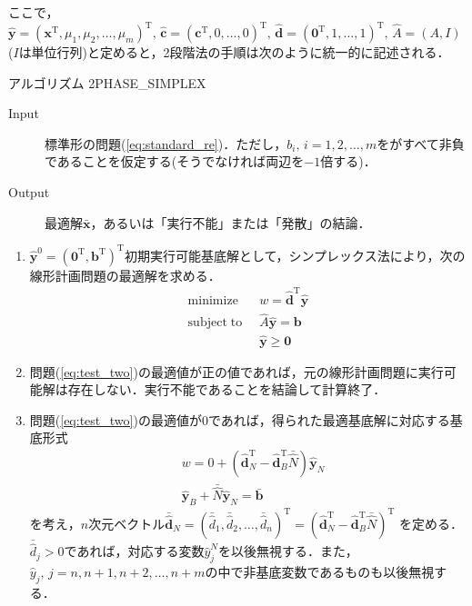\documentclass{jsreport}
\begin{document}
ここで，$\hat{\bm{y}} = (\bm{x}^{\mathrm{T}}, \mu_1, \mu_2, \ldots, \mu_m)^{\mathrm{T}}, \,
\hat{\bm{c}} = (\bm{c}^{\mathrm{T}}, 0, \ldots, 0)^{\mathrm{T}}, \,
\hat{\bm{d}} = (\bm{0}^{\mathrm{T}}, 1, \ldots, 1)^{\mathrm{T}}, \,
\hat{A} = (A, I)$($I$は単位行列)と定めると，2段階法の手順は次のように統一的に記述される．

\begin{itembox}[l]{アルゴリズム 2PHASE\_SIMPLEX}
  \begin{description}
    \item[Input] 標準形の問題(\ref{eq:standard_re})．ただし，$b_i, \, i = 1, 2, \ldots, m$をがすべて非負であることを仮定する(そうでなければ両辺を$-1$倍する)．
    \item[Output] 最適解$\bar{\bm{x}}$，あるいは「実行不能」または「発散」の結論．
  \end{description}
  \begin{enumerate}
    \item $\hat{\bm{y}}^0 = (\bm{0}^{\mathrm{T}},\bm{b}^{\mathrm{T}})^{\mathrm{T}}$初期実行可能基底解として，シンプレックス法により，次の線形計画問題の最適解を求める．
    \begin{align}\label{eq:test_two}
      \mathrm{minimize} \; \; &w = \hat{\bm{d}}^{\mathrm{T}} \hat{\bm{y}} \nonumber \\
      \mathrm{subject \; to} \; \; &\hat{A}\hat{\bm{y}} = \bm{b} \\
      &\hat{\bm{y}} \geq \bm{0} \nonumber
    \end{align}
    \item 問題(\ref{eq:test_two})の最適値が正の値であれば，元の線形計画問題に実行可能解は存在しない．実行不能であることを結論して計算終了．
    \item 問題(\ref{eq:test_two})の最適値が$0$であれば，得られた最適基底解に対応する基底形式
    \begin{align}\label{eq:two_basic}
      &w = 0 + (\hat{\bm{d}}_N^{\mathrm{T}} - \hat{\bm{d}}_B^{\mathrm{T}}\bar{\hat{N}}) \hat{\bm{y}}_N \nonumber \\
      &\hat{\bm{y}}_B + \bar{\hat{N}}\hat{\bm{y}}_N = \bar{\bm{b}}
    \end{align}
    を考え，$n$次元ベクトル$\bar{\hat{\bm{d}}}_N = (\bar{\hat{d}}_1, \bar{\hat{d}}_2, \ldots, \bar{\hat{d}}_n)^{\mathrm{T}} = (\hat{\bm{d}}_N^{\mathrm{T}} - \hat{\bm{d}}_B^{\mathrm{T}}\bar{\hat{N}})^{\mathrm{T}}$
    を定める．$\bar{\hat{d}}_j > 0$であれば，対応する変数$\hat{y}_j^N$を以後無視する．また，
    $\hat{y}_j, \, j = n, n+1, n+2, \ldots, n+m$の中で非基底変数であるものも以後無視する．

\end{enumerate}
\end{itembox}
\end{document}
